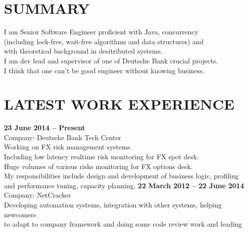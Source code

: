 \documentclass[margin,12pt]{res}
\begin{document}
  \address{
    kremsnx@gmail.com\\
    +7 (985) 9-64-8-512}

\begin{resume}
\section{SUMMARY}
I am Senior Software Engineer proficient with Java, concurrency \\
(including lock-free, wait-free algorithms and data structures) and\\
with theoretical background in desitributed systems.\\
I am dev lead and supervisor of one of Deutsche Bank crucial projects.\\
I think that one can't be good engineer without knowing business.

\section{LATEST WORK EXPERIENCE} 
\textbf{23 June 2014 -- Present}\\
Company: Deutsche Bank Tech Center\\
Working on FX risk management systems.\\
Including low latency realtime risk monitoring for FX spot desk.\\
Huge volumes of various risks monitoring for FX options desk.\\
My responsibilities include design and development of business logic, profiling \\
and performance tuning, capacity planning.
\newline
\textbf{22 March 2012 -- 22 June 2014}\\
Company: NetCracker\\
Developing automation systems, integration with other systems, helping newcomers\\
 to adapt to company framework and doing some code review work and leading


\end{resume}
\end{document}

